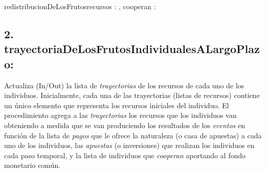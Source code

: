 \documentclass[10pt,a4paper]{article}
\begin{document}
	\begin{proc}{redistribucionDeLosFrutos}{\In recursos : \TLista{\float}, \In cooperan : \TLista{\bool}}{\TLista{\float}}
		\hfill 

		{ 
		}

		\hfill 
		

		\hfill 


		

	\end{proc}
	
	\subsection*{2. trayectoriaDeLosFrutosIndividualesALargoPlazo:}
	Actualiza (In/Out) la lista de 
	\textit{trayectorias}
	de los recursos de cada uno de los individuos. Inicialmente, cada una de las trayectorias (listas de recursos) contiene un único elemento que representa los recursos iniciales
	del individuo. El procedimiento agrega a las 
	\textit{trayectorias}
	los recursos que los individuos van obteniendo a medida que se van produciendo los resultados de los 
	\textit{eventos}
	en función de la lista de 
	\textit{pagos}
	que le ofrece la naturaleza (o casa de apuestas) a cada uno de los individuos, las 
	\textit{apuestas}
	(o inversiones) que realizan los individuos en cada paso temporal, y la lista de individuos que 
	\textit{cooperan}
	aportando al fondo monetario común.
\end{document}
